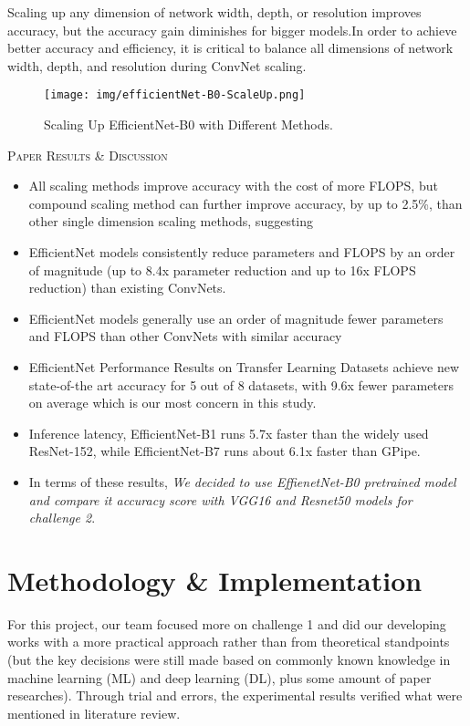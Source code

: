 \documentclass[10pt,twocolumn,letterpaper]{article}
\begin{document}
Scaling up any dimension of network width, depth, or resolution improves accuracy, but the accuracy gain diminishes for bigger models.In order to achieve better accuracy and efficiency, it is critical to balance all dimensions of network width, depth, and resolution during ConvNet scaling.\begin{figure}[h]

\centering
\texttt{[image: img/efficientNet-B0-ScaleUp.png]}
\caption{Scaling Up EfficientNet-B0 with Different Methods. \cite{Efficientnet} \label{figure:efficientNet-B0-ScaleUp}}
\end{figure}
\newline
\textsc{Paper Results \& Discussion}
\begin{itemize}
    \item All scaling methods improve accuracy with the cost of more FLOPS, but compound scaling method can further improve accuracy, by up to 2.5\%, than other single dimension scaling methods, suggesting 
    \item EfficientNet models consistently reduce parameters and FLOPS by an order of magnitude (up to 8.4x parameter reduction and up to 16x FLOPS reduction) than existing ConvNets.
    \item EfficientNet models generally use an order of magnitude fewer parameters and FLOPS than other ConvNets with similar accuracy
    \item EfficientNet Performance Results on Transfer Learning Datasets  achieve new state-of-the art accuracy for 5 out of 8 datasets, with 9.6x fewer parameters on average which is our most concern in this study.
    \item Inference latency, EfficientNet-B1 runs 5.7x faster than the widely used ResNet-152, while EfficientNet-B7 runs about 6.1x faster than GPipe.
    \item In terms of these results, \textit{We decided to use EffienetNet-B0 pretrained model and compare it accuracy score with VGG16 and Resnet50 models for challenge 2}.
\end{itemize}
\section{Methodology \& Implementation}
\label{section:method-and-implementation}
For this project, our team focused more on challenge 1 and did our developing works with a more practical approach rather than from theoretical standpoints (but the key decisions were still made based on commonly known knowledge in machine learning (ML) and deep learning (DL), plus some amount of paper researches). Through trial and errors, the experimental results verified what were mentioned in literature review.
\end{document}
